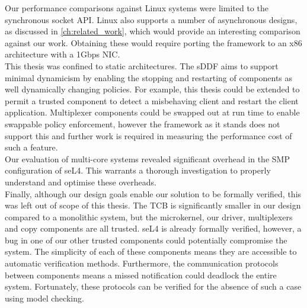 Our performance comparisons against Linux systems were limited to the synchronous socket API. Linux also supports a number
of asynchronous designs, as discussed in \autoref{ch:related_work}, which would provide an interesting comparison against 
our work. Obtaining these would require porting the framework to an x86 architecture with a 1Gbps NIC. \\

This thesis was confined to static architectures. The sDDF aims to support minimal dynamicism by enabling the stopping and restarting
of components as well dynamically changing policies. For example, this thesis could be extended to permit a trusted component
to detect a misbehaving client and restart the client application. Multiplexer components could be swapped out at run time to enable
swappable policy enforcement, however the framework as it stands does not support this and further work is required in measuring 
the performance cost of such a feature. \\

Our evaluation of multi-core systems revealed significant overhead in the SMP configuration of seL4. This warrants a thorough investigation
to properly understand and optimise these overheads. \\

Finally, although our design goals enable our solution to be formally verified, this was left out of scope of this thesis.
The TCB is significantly smaller in our design compared to a monolithic system, but the microkernel, our driver, multiplexers 
and copy components are all trusted. seL4 is already formally verified, however, a bug in one of our other trusted components 
could potentially compromise the system. The simplicity of each of these components means they are accessible to automatic
verification methods. Furthermore, the communication protocols between components means a missed notification could deadlock
the entire system. Fortunately, these protocols can be verified for the absence of such a case using model checking. \\
